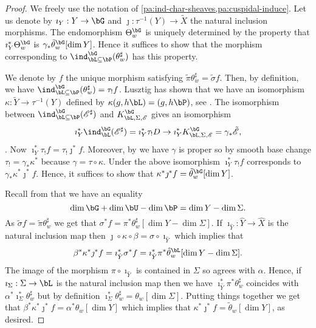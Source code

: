\documentclass[eqthmnum,nocolour,skinny]{jt-calcs}
\begin{document}
\begin{proof}
We freely use the notation of \cref{pa:ind-char-sheaves,pa:cuspidal-induce}. Let us denote by $\imath_Y : Y \to \bG$ and $\jmath : \tau^{-1}(Y) \to \tilde{X}$ the natural inclusion morphisms. The endomorphism $\Theta_w^{\bG}$ is uniquely determined by the property that $\imath_Y^*\Theta_w^{\bG}$ is $\gamma_*\tilde{\theta}_w^{\bG}[\dim Y]$. Hence it suffices to show that the morphism corresponding to $\ind_{\bL\subseteq\bP}^{\bG}(\theta_w^{\sharp})$ has this property.

We denote by $f$ the unique morphism satisfying $\tilde{\pi}\theta_w^{\sharp} = \tilde{\sigma}f$. Then, by definition, we have $\ind_{\bL\subseteq\bP}^{\bG}(\theta_w^{\sharp}) = \tau_!f$. Lusztig has shown that we have an isomorphism $\kappa : \tilde{Y} \to \tau^{-1}(Y)$ defined by $\kappa(g,h\bL) = (g,h\bP)$, see \cite[4.3(c)]{lusztig:1984:intersection-cohomology-complexes}. The isomorphism between $\ind_{\bL\subseteq\bP}^{\bG}(\mathscr{E}^{\sharp})$ and $K_{\bL,\Sigma,\mathscr{E}}^{\bG}$ gives an isomorphism
\begin{equation*}
\imath_Y^*\ind_{\bL}^{\bG}(\mathscr{E}^{\sharp}) = \imath_Y^*\tau_!D \to \imath_Y^*K_{\bL,\Sigma,\mathscr{E}}^{\bG} = \gamma_*\tilde{\mathscr{E}},
\end{equation*}
\cite[4.4, 4.5]{lusztig:1984:intersection-cohomology-complexes}. Now $\imath_Y^*\tau_!f = \tau_!\jmath^*f$. Moreover, by \cite[4.3(b)]{lusztig:1984:intersection-cohomology-complexes} we have $\gamma$ is proper so by smooth base change $\tau_! = \gamma_* \kappa^*$ because $\gamma = \tau\circ \kappa$. Under the above isomorphism $\imath_Y^*\tau_!f$ corresponds to $\gamma_*\kappa^*\jmath^*f$. Hence, it suffices to show that $\kappa^*\jmath^*f = \tilde{\theta}_w^{\bG}[\dim Y]$.

Recall from \cite[4.3(a)]{lusztig:1984:intersection-cohomology-complexes} that we have an equality
\begin{equation*}
\dim\bG + \dim\bU - \dim\bP = \dim Y - \dim\Sigma.
\end{equation*}
As $\tilde{\sigma}f = \tilde{\pi}\theta_w^{\sharp}$ we get that $\sigma^*f = \pi^*\theta_w^{\sharp}[\dim Y - \dim \Sigma]$. If $\imath_{\hat{Y}} : \hat{Y} \to \hat{X}$ is the natural inclusion map then $\jmath\circ\kappa\circ\beta = \sigma\circ\imath_{\hat{Y}}$ which implies that
\begin{equation*}
\beta^*\kappa^*\jmath^*f = \imath_{\hat{Y}}^*\sigma^*f = \imath_{\hat{Y}}^*\pi^*\hat{\theta}_w^{\bL}[\dim Y - \dim \Sigma].
\end{equation*}
The image of the morphism $\pi\circ \imath_{\hat{Y}}$ is contained in $\Sigma$ so agrees with $\alpha$. Hence, if $\imath_{\Sigma} : \Sigma \to \bL$ is the natural inclusion map then we have $\imath_{\hat{Y}}^*\pi^*\theta_w^{\sharp}$ coincides with $\alpha^*\imath_{\Sigma}^*\theta_w^{\sharp}$ but by definition $\imath_{\Sigma}^*\theta_w^{\sharp} = \theta_w[\dim\Sigma]$. Putting things together we get that $\beta^*\kappa^*\jmath^*f = \alpha^*\theta_w[\dim Y]$ which implies that $\kappa^*\jmath^*f = \tilde{\theta}_w[\dim Y]$, as desired.
\end{proof}
\end{document}
